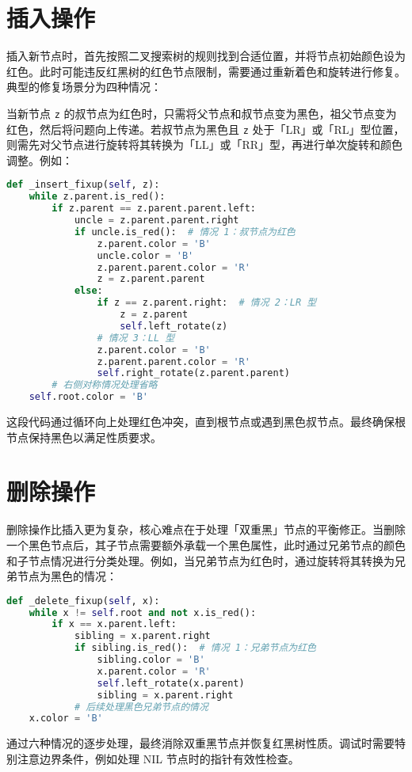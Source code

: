 \section{插入操作}
插入新节点时，首先按照二叉搜索树的规则找到合适位置，并将节点初始颜色设为红色。此时可能违反红黑树的红色节点限制，需要通过重新着色和旋转进行修复。典型的修复场景分为四种情况：\par
当新节点 \verb!z! 的叔节点为红色时，只需将父节点和叔节点变为黑色，祖父节点变为红色，然后将问题向上传递。若叔节点为黑色且 \verb!z! 处于「LR」或「RL」型位置，则需先对父节点进行旋转将其转换为「LL」或「RR」型，再进行单次旋转和颜色调整。例如：\par
\begin{lstlisting}[language=python]
def _insert_fixup(self, z):
    while z.parent.is_red():
        if z.parent == z.parent.parent.left:
            uncle = z.parent.parent.right
            if uncle.is_red():  # 情况 1：叔节点为红色
                z.parent.color = 'B'
                uncle.color = 'B'
                z.parent.parent.color = 'R'
                z = z.parent.parent
            else:
                if z == z.parent.right:  # 情况 2：LR 型
                    z = z.parent
                    self.left_rotate(z)
                # 情况 3：LL 型
                z.parent.color = 'B'
                z.parent.parent.color = 'R'
                self.right_rotate(z.parent.parent)
        # 右侧对称情况处理省略
    self.root.color = 'B'
\end{lstlisting}
这段代码通过循环向上处理红色冲突，直到根节点或遇到黑色叔节点。最终确保根节点保持黑色以满足性质要求。\par
\section{删除操作}
删除操作比插入更为复杂，核心难点在于处理「双重黑」节点的平衡修正。当删除一个黑色节点后，其子节点需要额外承载一个黑色属性，此时通过兄弟节点的颜色和子节点情况进行分类处理。例如，当兄弟节点为红色时，通过旋转将其转换为兄弟节点为黑色的情况：\par
\begin{lstlisting}[language=python]
def _delete_fixup(self, x):
    while x != self.root and not x.is_red():
        if x == x.parent.left:
            sibling = x.parent.right
            if sibling.is_red():  # 情况 1：兄弟节点为红色
                sibling.color = 'B'
                x.parent.color = 'R'
                self.left_rotate(x.parent)
                sibling = x.parent.right
            # 后续处理黑色兄弟节点的情况
    x.color = 'B'
\end{lstlisting}
通过六种情况的逐步处理，最终消除双重黑节点并恢复红黑树性质。调试时需要特别注意边界条件，例如处理 NIL 节点时的指针有效性检查。\par
